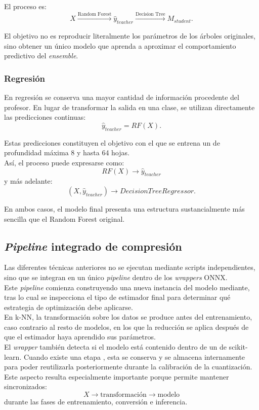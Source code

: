 \documentclass[a4paper,12pt,twoside,final]{book}
\begin{document}
El proceso es:
\[
X \xrightarrow{\text{Random Forest}} \hat{y}_{teacher} \xrightarrow{\text{Decision Tree}} M_{student}.
\]

El objetivo no es reproducir literalmente los parámetros de los árboles originales, sino obtener un único modelo que
aprenda a aproximar el comportamiento predictivo del \textit{ensemble}.

\subsubsection{Regresión}
En regresión se conserva una mayor cantidad de información procedente del profesor. En lugar de transformar la salida
en una clase, se utilizan directamente las predicciones continuas:
\[
\hat{y}_{teacher} = RF(X)\text{.}
\]

Estas predicciones constituyen el objetivo con el que se entrena un  de profundidad máxima
8 y hasta 64 hojas.\\

Así, el proceso puede expresarse como:
\[
RF(X) \rightarrow \hat{y}_{teacher}
\]
y más adelante:
\[
(X, \hat{y}_{teacher}) \rightarrow DecisionTreeRegressor\text{.}
\]

En ambos casos, el modelo final presenta una estructura sustancialmente más sencilla que el Random Forest original.

\subsection{\textit{Pipeline} integrado de compresión}
Las diferentes técnicas anteriores no se ejecutan mediante scripts independientes, sino que se integran en un único
\textit{pipeline} dentro de los \textit{wrappers} ONNX.\\

Este \textit{pipeline} comienza construyendo una nueva instancia del modelo mediante, tras lo cual se inspecciona el
tipo de estimador final para determinar qué estrategia de optimización debe aplicarse.\\

En k-NN, la transformación sobre los datos se produce antes del entrenamiento, caso contrario al resto de modelos, en
los que la reducción se aplica después de que el estimador haya aprendido sus parámetros.\\

El \textit{wrapper} también detecta si el modelo está contenido dentro de un  de scikit-learn. Cuando
existe una etapa , esta se conserva y se almacena internamente para poder reutilizarla posteriormente
durante la calibración de la cuantización. Este aspecto resulta especialmente importante porque permite mantener
sincronizados:
\[
X \rightarrow \text{transformación} \rightarrow \text{modelo}
\]
durante las fases de entrenamiento, conversión e inferencia.  
\end{document}
